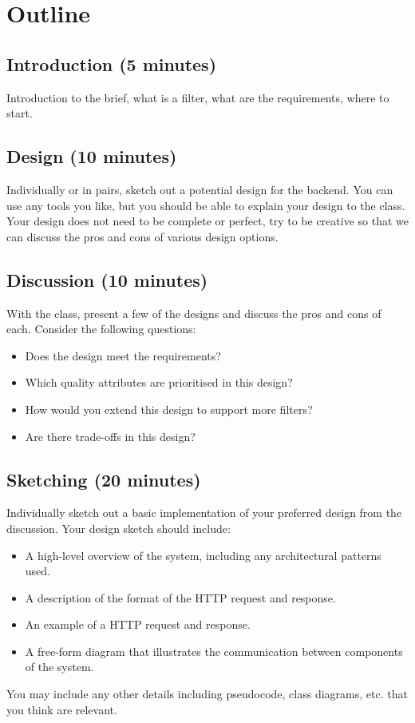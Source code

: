 \documentclass{csse4400}
\begin{document}
\section{Outline}

\subsection*{Introduction (5 minutes)}
Introduction to the brief, what is a filter, what are the requirements, where to start.

\subsection*{Design (10 minutes)}
Individually or in pairs, sketch out a potential design for the backend.
You can use any tools you like, but you should be able to explain your design to the class.
Your design does not need to be complete or perfect,
try to be creative so that we can discuss the pros and cons of various design options.

\subsection*{Discussion (10 minutes)}
With the class, present a few of the designs and discuss the pros and cons of each.
Consider the following questions:
\begin{itemize}
    \item Does the design meet the requirements?
    \item Which quality attributes are prioritised in this design?
    \item How would you extend this design to support more filters?
    \item Are there trade-offs in this design?
\end{itemize}


\subsection*{Sketching (20 minutes)}
Individually sketch out a basic implementation of your preferred design from the discussion.
Your design sketch should include:
\begin{itemize}
    \item A high-level overview of the system, including any architectural patterns used.
    \item A description of the format of the HTTP request and response.
    \item An example of a HTTP request and response.
    \item A free-form diagram that illustrates the communication between components of the system.
\end{itemize}
You may include any other details including pseudocode, class diagrams, etc. that you think are relevant.
\end{document}
